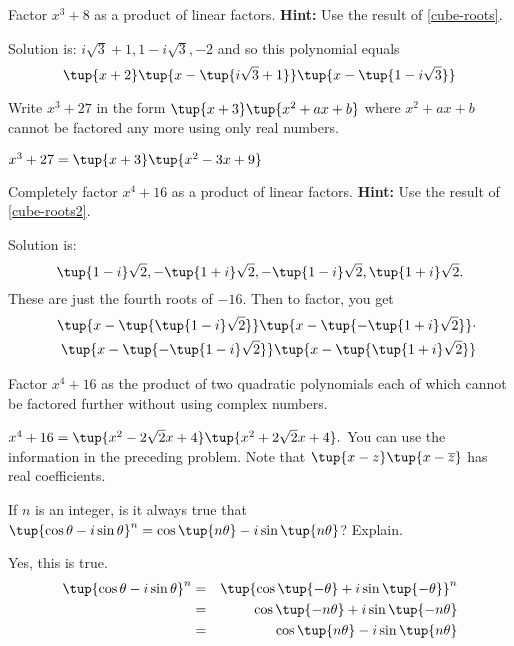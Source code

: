 \begin{enumialphparenastyle}
\begin{ex} Factor $x^{3}+8$ as a product of linear factors. \textbf{Hint:} Use the result of {\eqref{cube-roots}}.
\begin{sol}
Solution
is: $i\sqrt{3}+1,1-i\sqrt{3},-2$ and so this polynomial equals
\[
\tup{x+2} \tup{x-\tup{i\sqrt{3}+1} } \tup{x-\tup{
1-i\sqrt{3}} }
\]
\end{sol}
\end{ex}

\begin{ex} Write $x^{3}+27$ in the form $\tup{x+3} \tup{
x^{2}+ax+b} $ where $x^{2}+ax+b$ cannot be factored any more using
only real numbers. 
\begin{sol}
$x^{3}+27= \tup{x+3} \tup{
x^{2}-3x+9} $
\end{sol}
\end{ex}

\begin{ex} Completely factor $x^{4}+16$ as a product of linear factors. \textbf{Hint:} Use the result of {\eqref{cube-roots2}}. 
\begin{sol}
Solution is:
\[
\tup{1-i} \sqrt{2},-\tup{1+i} \sqrt{2},-\tup{1-i}
\sqrt{2},\tup{1+i} \sqrt{2}.
\]
These are just the fourth roots of $-16$. Then to factor, you get
\begin{eqnarray*}
&&\tup{x-\tup{\tup{1-i} \sqrt{2}} } \tup{x-\tup{
-\tup{1+i} \sqrt{2}} } \cdot \\
&&\tup{x-\tup{-\tup{1-i} \sqrt{2}} } \tup{x-\tup{
\tup{1+i} \allowbreak \sqrt{2}} }
\end{eqnarray*}
\end{sol}
\end{ex}


\begin{ex} Factor $x^{4}+16$ as the product of two quadratic polynomials each of
which cannot be factored further without using complex numbers. 
\begin{sol}
$x^{4}+16=\tup{x^{2}-2\sqrt{2}x+4} \tup{x^{2}+2\sqrt{2}x+4} .
$ You can use the information in the preceding problem. Note that $\tup{
x-z} \tup{x-\overline{z}} $ has real coefficients.
\end{sol}
\end{ex}

\begin{ex} If $n$ is an integer, is it always true that $\tup{\cos \theta
-i\sin \theta } ^{n}=\cos \tup{n\theta } -i\sin \tup{n\theta
}$? Explain.
\begin{sol}
Yes, this is true.
\begin{eqnarray*}
\tup{\cos \theta -i\sin \theta } ^{n} &=&\tup{\cos \tup{-\theta
} +i\sin \tup{-\theta } } ^{n} \\
&=&\cos \tup{-n\theta } +i\sin \tup{-n\theta } \\
&=&\cos \tup{n\theta } -i\sin \tup{n\theta }
\end{eqnarray*}
\end{sol}
\end{ex}



\end{enumialphparenastyle}
